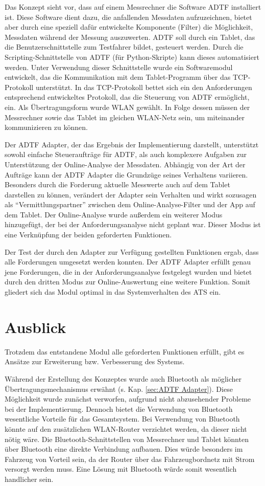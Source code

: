 \documentclass[12pt,a4paper]{report}
\begin{document}
Das Konzept sieht vor, dass auf einem Messrechner die Software ADTF installiert ist. Diese Software dient dazu, die anfallenden Messdaten aufzuzeichnen, bietet aber durch eine speziell dafür entwickelte Komponente (Filter) die Möglichkeit, Messdaten während der Messung auszuwerten. ADTF soll durch ein Tablet, das die Benutzerschnittstelle zum Testfahrer bildet, gesteuert werden. Durch die Scripting-Schnittstelle von ADTF (für Python-Skripte) kann dieses automatisiert werden. Unter Verwendung dieser Schnittstelle wurde ein Softwaremodul entwickelt, das die Kommunikation mit dem Tablet-Programm über das TCP-Protokoll unterstützt. In das TCP-Protokoll bettet sich ein den Anforderungen entsprechend entwickeltes Protokoll, das die Steuerung von ADTF ermöglicht, ein. Als Übertragungsform wurde WLAN gewählt. In Folge dessen müssen der Messrechner sowie das Tablet im gleichen WLAN-Netz sein, um miteinander kommunizieren zu können.

Der ADTF Adapter, der das Ergebnis der Implementierung darstellt, unterstützt sowohl einfache Steueraufträge für ADTF, als auch komplexere Aufgaben zur Unterstützung der Online-Analyse der Messdaten. Abhängig von der Art der Aufträge kann der ADTF Adapter die Grundzüge seines Verhaltens variieren. Besonders durch die Forderung aktuelle Messwerte auch auf dem Tablet darstellen zu können, verändert der Adapter sein Verhalten und wirkt sozusagen als "`Vermittlungspartner"' zwischen dem Online-Analyse-Filter und der App auf dem Tablet. Der Online-Analyse wurde au\ss erdem ein weiterer Modus hinzugefügt, der bei der Anforderungsanalyse nicht geplant war. Dieser Modus ist eine Verknüpfung der beiden geforderten Funktionen.

Der Test der durch den Adapter zur Verfügung gestellten Funktionen ergab, dass alle Forderungen umgesetzt werden konnten. Der ADTF Adapter erfüllt genau jene Forderungen, die in der Anforderungsanalyse festgelegt wurden und bietet durch den dritten Modus zur Online-Auswertung eine weitere Funktion. Somit gliedert sich das Modul optimal in das Systemverhalten des ATS ein.
\section{Ausblick}\label{sec:Ausblick}
Trotzdem das entstandene Modul alle geforderten Funktionen erfüllt, gibt es Ansätze zur Erweiterung bzw. Verbesserung des Systems. 

Während der Erstellung des Konzeptes wurde auch Bluetooth als möglicher Übertra\-gungsmechanismus erwähnt (s. Kap. \ref{sec:ADTF Adapter}). Diese Möglichkeit wurde zunächst verworfen, aufgrund nicht abzusehender Probleme bei der Implementierung. Dennoch bietet die Verwendung von Bluetooth wesentliche Vorteile für das Gesamtsystem. Bei Verwendung von Bluetooth könnte auf den zusätzlichen WLAN-Router verzichtet werden, da dieser nicht nötig wäre. Die Bluetooth-Schnittstellen von Messrechner und Tablet könnten über Bluetooth eine direkte Verbindung aufbauen. Dies würde besonders im Fahrzeug von Vorteil sein, da der Router über das Fahrzeugbordnetz mit Strom versorgt werden muss. Eine Lösung mit Bluetooth würde somit wesentlich handlicher sein.
\end{document}
